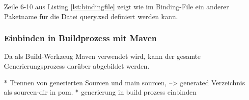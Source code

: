 Zeile 6-10 aus Listing \ref{lst:bindingfile} zeigt wie im Binding-File ein anderer Paketname für die Datei query.xsd definiert werden kann. 

\subsubsection{Einbinden in Buildprozess mit Maven}
Da als Build-Werkzeug Maven verwendet wird, kann der gesamte Generierungsprozess darüber abgebildet werden. 

* Trennen von generierten Sourcen und main sourcen, --> generated Verzeichnis als sourcen-dir in pom.
* generierung in build prozess einbinden


